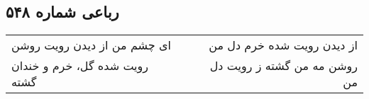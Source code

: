 \begin{center}
\section*{رباعی شماره ۵۴۸}
\label{sec:sh548}
\begin{longtable}{l p{0.5cm} r}
ای چشم من از دیدن رویت روشن
&&
از دیدن رویت شده خرم دل من
\\
رویت شده گل، خرم و خندان گشته
&&
روشن مه من گشته ز رویت دل من
\\
\end{longtable}
\end{center}
